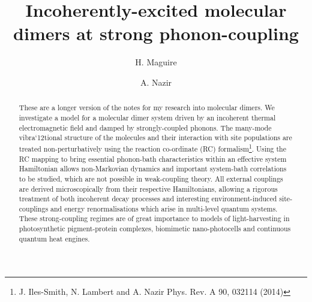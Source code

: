 \documentclass[]{article}
\title{Incoherently-excited molecular dimers at strong phonon-coupling}
\author[1]{H. Maguire}
\author[1]{A. Nazir}
\affil[1]{Photon Science Institute and School of Physics and Astronomy, The University of Manchester, Oxford Road,
	Manchester M13 9PL, United Kingdom}
\begin{document}
\tableofcontents
\maketitle

\begin{abstract}

These are a longer version of the notes for my research into molecular dimers. We investigate a model for a molecular dimer system driven by an incoherent thermal electromagnetic field and damped by strongly-coupled phonons. The many-mode vibra`12tional structure of the molecules and their interaction with site populations are treated non-perturbatively using the reaction co-ordinate (RC) formalism\footnote{J. Iles-Smith, N. Lambert and A. Nazir Phys. Rev. A 90, 032114 (2014)}. Using the RC mapping to bring essential phonon-bath characteristics within an effective system Hamiltonian allows non-Markovian dynamics and important system-bath correlations to be studied, which are not possible in weak-coupling theory. All external couplings are derived microscopically from their respective Hamiltonians, allowing a rigorous treatment of both incoherent decay processes and interesting environment-induced site-couplings and energy renormalisations which arise in multi-level quantum systems. These strong-coupling regimes are of great importance to models of light-harvesting in photosynthetic pigment-protein complexes, biomimetic nano-photocells and continuous quantum heat engines.

\end{abstract}
\end{document}
